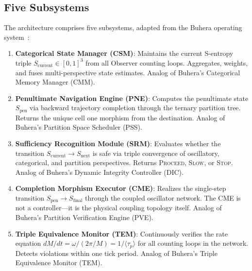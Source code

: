 \documentclass[twocolumn,10pt]{article}
\theoremstyle{definition}
\newcommand{\taup}{\tau_p}
\newcommand{\Scurrent}{S_{\mathrm{current}}}
\newcommand{\Snext}{S_{\mathrm{next}}}
\newcommand{\Sfinal}{S_{\mathrm{final}}}
\newcommand{\Spen}{S_{\mathrm{pen}}}
\begin{document}
\subsection{Five Subsystems}

The architecture comprises five subsystems, adapted from the Buhera operating system~\cite{sachikonye2026buhera}:

\begin{enumerate}[leftmargin=*]
\item \textbf{Categorical State Manager (CSM)}: Maintains the current S-entropy triple $\Scurrent \in [0,1]^3$ from all Observer counting loops. Aggregates, weights, and fuses multi-perspective state estimates. Analog of Buhera's Categorical Memory Manager (CMM).

\item \textbf{Penultimate Navigation Engine (PNE)}: Computes the penultimate state $\Spen$ via backward trajectory completion through the ternary partition tree. Returns the unique cell one morphism from the destination. Analog of Buhera's Partition Space Scheduler (PSS).

\item \textbf{Sufficiency Recognition Module (SRM)}: Evaluates whether the transition $\Scurrent \to \Snext$ is safe via triple convergence of oscillatory, categorical, and partition perspectives. Returns \textsc{Proceed}, \textsc{Slow}, or \textsc{Stop}. Analog of Buhera's Dynamic Integrity Controller (DIC).

\item \textbf{Completion Morphism Executor (CME)}: Realizes the single-step transition $\Spen \to \Sfinal$ through the coupled oscillator network. The CME is not a controller---it is the physical coupling topology itself. Analog of Buhera's Partition Verification Engine (PVE).

\item \textbf{Triple Equivalence Monitor (TEM)}: Continuously verifies the rate equation $dM/dt = \omega/(2\pi/M) = 1/\langle \taup \rangle$ for all counting loops in the network. Detects violations within one tick period. Analog of Buhera's Triple Equivalence Monitor (TEM).
\end{enumerate}
\end{document}
